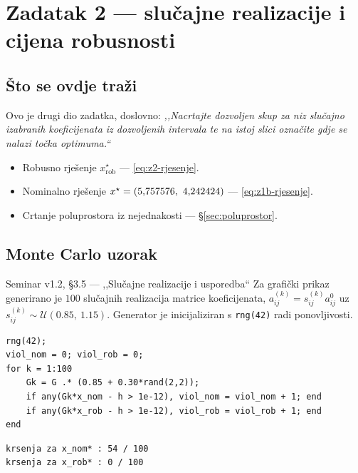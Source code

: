 \chapter{Zadatak 2 --- slučajne realizacije i cijena robusnosti}
\label{ch:z2-realizacije}

\section{Što se ovdje traži}

Ovo je drugi dio zadatka, doslovno: \emph{,,Nacrtajte dozvoljen skup za niz
slučajno izabranih koeficijenata iz dozvoljenih intervala te na istoj slici
označite gdje se nalazi točka optimuma.``}

\begin{predznanje}
\begin{itemize}[nosep,leftmargin=*]
  \item Robusno rješenje $x_{\mathrm{rob}}^{\star}$ --- \eqref{eq:z2-rjesenje}.
  \item Nominalno rješenje $x^{\star} = (5{,}757576,\ 4{,}242424)$ --- \eqref{eq:z1b-rjesenje}.
  \item Crtanje poluprostora iz nejednakosti --- \S\ref{sec:poluprostor}.
\end{itemize}
\end{predznanje}

\section{Monte Carlo uzorak}
\label{sec:z2-montecarlo}

\begin{seminar}{Seminar v1.2, §3.5 --- ,,Slučajne realizacije i usporedba``}
Za grafički prikaz generirano je $100$ slučajnih realizacija matrice
koeficijenata, $a_{ij}^{(k)} = s_{ij}^{(k)} a_{ij}^0$ uz
$s_{ij}^{(k)} \sim \mathcal{U}(0.85,\ 1.15)$. Generator je inicijaliziran s
\texttt{rng(42)} radi ponovljivosti.

\begin{lstlisting}[style=matlabstyle]
rng(42);
viol_nom = 0; viol_rob = 0;
for k = 1:100
    Gk = G .* (0.85 + 0.30*rand(2,2));
    if any(Gk*x_nom - h > 1e-12), viol_nom = viol_nom + 1; end
    if any(Gk*x_rob - h > 1e-12), viol_rob = viol_rob + 1; end
end
\end{lstlisting}

\begin{lstlisting}[style=outputstyle]
krsenja za x_nom* : 54 / 100
krsenja za x_rob* : 0 / 100
\end{lstlisting}
\end{seminar}

